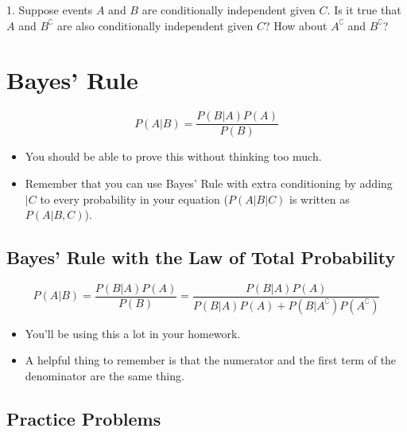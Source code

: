 \documentclass{article}
\begin{document}


1. Suppose events $A$ and $B$ are conditionally independent given $C$. Is it true that $A$ and $B^\complement$ are also conditionally independent given $C$? How about $A^\complement$ and $B^\complement$?


\section{Bayes' Rule}

$$P(A|B) = \frac{P(B|A)P(A)}{P(B)}$$
\begin{itemize}
    \item You should be able to prove this without thinking too much.
    \item Remember that you can use Bayes' Rule with extra conditioning by adding $|C$ to every probability in your equation ($P(A|B|C)$ is written as $P(A|B, C)$).
\end{itemize}

\subsection{Bayes' Rule with the Law of Total Probability}

$$P(A|B) = \frac{P(B|A)P(A)}{P(B)} = \frac{P(B|A)P(A)}{P(B|A)P(A) + P(B|A^\complement)P(A^\complement)}$$

\begin{itemize}
    \item You'll be using this a lot in your homework.
    \item A helpful thing to remember is that the numerator and the first term of the denominator are the same thing.
\end{itemize}

\subsection{Practice Problems}
\end{document}
